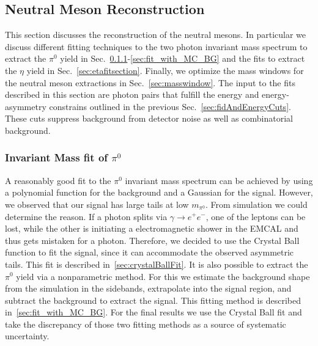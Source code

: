 \subsection{Neutral Meson Reconstruction}
\label{sec:neutralmesonreconstruction}
This section discusses the reconstruction of the neutral mesons. In particular we discuss different fitting techniques to the two photon invariant mass spectrum to extract the $\pi^0$ yield in Sec.~\ref{sec:pi0fitsection}-\ref{sec:fit_with_MC_BG} and the fits to extract the $\eta$ yield in Sec.~\ref{sec:etafitsection}. Finally, we optimize the mass windows for the neutral meson extractions in Sec.~\ref{sec:masswindow}. The input to the fits described in this section are photon pairs that fulfill the energy and energy-asymmetry constrains outlined in the previous Sec.~\ref{sec:fidAndEnergyCuts}. 
These cuts suppress background from detector noise as well as combinatorial background.

\subsubsection{\texorpdfstring{Invariant Mass fit of $\pi^0$}{pi0 fit}}
\label{sec:pi0fitsection}
A reasonably good fit to the $\pi^0$ invariant mass spectrum can be achieved by using a polynomial function for the background and a Gaussian for the signal. However, we observed that our signal has large tails at low $m_{\pi^0}$. From simulation we could determine the reason. If a photon splits via  $\gamma\rightarrow e^+e^-$, one of the leptons can be lost, while the other is initiating a electromagnetic shower in the EMCAL and thus gets mistaken for a photon.
 Therefore, we decided to use the Crystal Ball function to fit the signal, since it can accommodate the observed asymmetric tails.  This fit is described in~\ref{sec:crystalBallFit}.
 It is also possible to extract the $\pi^0$ yield via a nonparametric method. For this we estimate the background shape from the simulation in the sidebands, extrapolate into the signal region, and subtract the background to extract the signal.  This fitting method is described in~\ref{sec:fit_with_MC_BG}.
For the final results we use the Crystal Ball fit and take the discrepancy of those two fitting methods as a source of systematic uncertainty.

